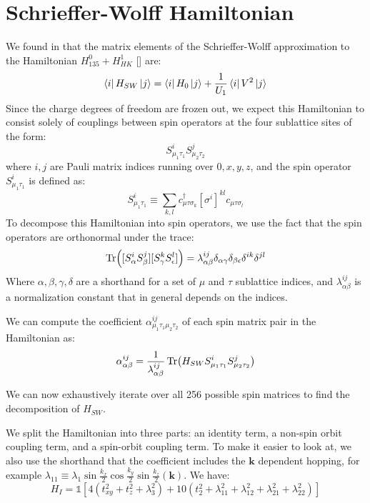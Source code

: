 \documentclass[prb,aps,amssymb,twocolumn,notitlepage]{revtex4-2}
\begin{document}
\onecolumngrid
\appendix



\section{Schrieffer-Wolff Hamiltonian}
\label{sec:Schrieffer-Wolff Appendix}
We found in  that the matrix elements of the Schrieffer-Wolff approximation to the Hamiltonian $H_{135}^{0}+H_{HK}^{1}$ [] are:
\begin{equation}
\bra{i}H_{SW}\ket{j}=\bra{i}H_{0}\ket{j}+\frac{1}{U_{1}}\bra{i}V^{2}\ket{j}
\end{equation}
Since the charge degrees of freedom are frozen out, we expect this Hamiltonian to consist solely of couplings between spin operators at the four sublattice sites of the form:
\begin{equation}
    S^{i}_{\mu_{1}\tau_{1}}S^{j}_{\mu_{2}\tau_{2}}
\end{equation}
where $i,j$ are Pauli matrix indices running over $0,x,y,z$, and the spin operator $S^{i}_{\mu_1\tau_1}$ is defined as:
\begin{equation}
    S^{i}_{\mu_1\tau_1}\equiv \sum_{k,l}c^\dagger_{\mu\tau\sigma_k}[\sigma^{i}]^{kl}c_{\mu\tau\sigma_l}
\end{equation}
To decompose this Hamiltonian into spin operators, we use the fact that the spin operators are orthonormal under the trace:
\begin{equation}
\Tr([S^{i}_{\alpha}S^{j}_{\beta}][S^{k}_{\gamma}S^{l}_{\epsilon}])=\lambda^{ij}_{\alpha\beta}\delta_{\alpha\gamma}\delta_{\beta\epsilon}\delta^{ik}\delta^{jl}
\end{equation}
Where $\alpha,\beta,\gamma,\delta$ are a shorthand for a set of $\mu$ and $\tau$ sublattice indices, and $\lambda^{ij}_{\alpha\beta}$ is a normalization constant that in general depends on the indices. 

We can compute the coefficient $\alpha^{ij}_{\mu_1\tau_1\mu_2\tau_2}$ of each spin matrix pair in the Hamiltonian as:
\begin{equation}
    \alpha^{ij}_{\alpha\beta}=\frac{1}{\lambda^{ij}_{\alpha\beta}}\Tr(H_{SW}S^{i}_{\mu_{1}\tau_{1}}S^{j}_{\mu_{2}\tau_{2}})
\end{equation}

We can now exhaustively iterate over all 256 possible spin matrices to find the decomposition of $H_{SW}$.

We split the Hamiltonian into three parts: an identity term, a non-spin orbit coupling term, and a spin-orbit coupling term.
To make it easier to look at, we also use the shorthand that the coefficient includes the $\mathbf{k}$ dependent hopping, for example $\lambda_{11}\equiv\lambda_{1}\sin\tfrac{k_x}{2}\cos\tfrac{k_y}{2}\sin\tfrac{k_z}{2}(\mathbf{k})$. 
We have:
\begin{equation}
H_{I}=\mathds{1}\left[4(t^2_{xy}+t^2_{z}+\lambda^2_{3})+10(t^2_{2}+\lambda^2_{11}+\lambda^2_{12}+\lambda^2_{21}+\lambda^2_{22})\right]
\end{equation}
    
\end{document}
